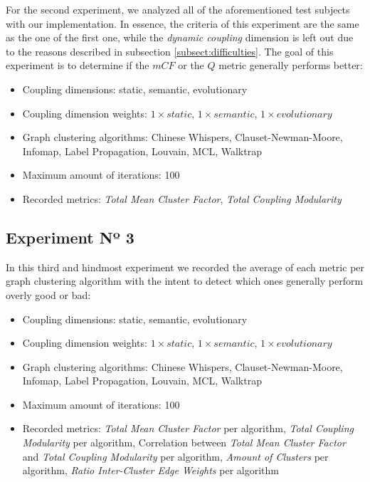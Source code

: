 \documentclass[12pt,a4paper]{report}
\begin{document}
For the second experiment, we analyzed all of the
aforementioned test subjects with our implementation. In essence, the criteria
of this experiment are the same as the one of the first one, while the \textit{
dynamic coupling} dimension is left out due to the reasons described in
subsection \ref{subsect:difficulties}. The goal of this experiment is to
determine if the $mCF$ or the $Q$ metric generally performs better:
\begin{itemize}[noitemsep]
    \item Coupling dimensions: static, semantic, evolutionary
    \item Coupling dimension weights: $1 \times static$, $1 \times semantic$, $1 \times evolutionary$
    \item Graph clustering algorithms: Chinese Whispers, Clauset-Newman-Moore, Infomap, Label Propagation, Louvain, MCL, Walktrap
    \item Maximum amount of iterations: 100
    \item Recorded metrics:
    \textit{Total Mean Cluster Factor},
    \textit{Total Coupling Modularity}
\end{itemize}


\subsection{Experiment Nº 3}

In this third and hindmost experiment we recorded
the average of each metric per graph clustering algorithm with the intent to
detect which ones generally perform overly good or bad:
\begin{itemize}[noitemsep]
    \item Coupling dimensions: static, semantic, evolutionary
    \item Coupling dimension weights: $1 \times static$, $1 \times semantic$, $1 \times evolutionary$
    \item Graph clustering algorithms: Chinese Whispers, Clauset-Newman-Moore, Infomap, Label Propagation, Louvain, MCL, Walktrap
    \item Maximum amount of iterations: 100
    \item Recorded metrics:
    \textit{Total Mean Cluster Factor} per algorithm,
    \textit{Total Coupling Modularity} per algorithm,
    Correlation between \textit{Total Mean Cluster Factor} and \textit{Total Coupling Modularity} per algorithm,
    \textit{Amount of Clusters} per algorithm,
    \textit{Ratio Inter-Cluster Edge Weights} per algorithm
\end{itemize}
\end{document}
